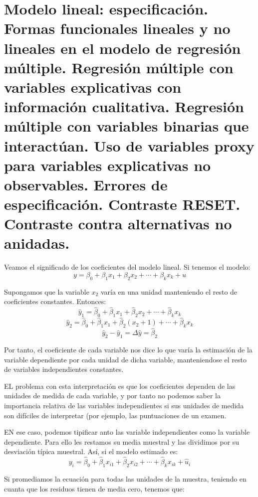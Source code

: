 
\chapter[Modelo lineal: especificaci\'on.]{Modelo lineal: especificaci\'on. \\
\normalsize  Formas funcionales lineales y no lineales en el modelo de regresi\'on m\'ultiple. Regresi\'on m\'ultiple con variables explicativas con informaci\'on cualitativa. Regresi\'on m\'ultiple con variables binarias que interact\'uan. Uso de variables proxy para variables explicativas no observables. Errores de especificaci\'on. Contraste RESET. Contraste contra alternativas no anidadas.}







Veamos el significado de los coeficientes del modelo lineal. Si tenemos el modelo:
\[y=\beta_0+\beta_1x_1+\beta_2x_2+\cdots+\beta_kx_k+u\]

Supongamos que la variable $x_2$ var\'ia en una unidad manteniendo el resto de coeficientes constantes. Entonces:
\[\hat{y}_1=\hat{\beta}_0+\hat{\beta}_1x_1+\hat{\beta}_2x_2+\cdots+\hat{\beta}_kx_k\]
\[\hat{y}_2=\hat{\beta}_0+\hat{\beta}_1x_1+\hat{\beta}_2(x_2+1)+\cdots+\hat{\beta}_kx_k\]
\[\hat{y}_2-\hat{y}_1=\Delta\hat{y}=\hat{\beta}_2\]

Por tanto, el coeficiente de cada variable nos dice lo que var\'ia la estimaci\'on de la variable dependiente por cada unidad de dicha variable, manteniendose el resto de variables independientes constantes.

EL problema con esta interpretaci\'on es que los coeficientes dependen de las unidades de medida de cada variable, y por tanto no podemos saber la importancia relativa de las variables independientes si sus unidades de medida son dif\'iciles de interpretar (por ejemplo, las puntuaciones de un examen.

EN ese caso, podemos tipificar anto las variable independientes como la variable dependiente. Para ello les restamos su media muestral y las dividimos por su desviaci\'on t\'ipica muestral. As\'i, si el modelo estimado es:
\[y_i=\hat{\beta}_0+\hat{\beta}_1x_{i1}+\hat{\beta}_2x_{i2}+\cdots+\hat{\beta}_kx_{ik}+\hat{u}_i\]

Si promediamos la ecuaci\'on para todas las unidades de la muestra, teniendo en cuanta que los residuos tienen de media cero, tenemos que:


